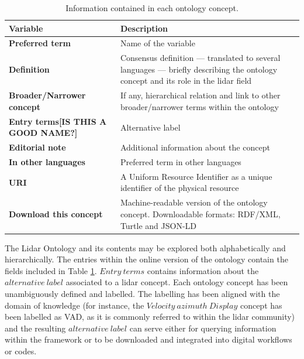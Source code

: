\documentclass[remotesensing,article,submit,pdftex,moreauthors]{Definitions/mdpi}
\begin{document}
\begin{table}[H] 
\caption{Information contained in each ontology concept.
\label{Ontology_var}}
{\def\arraystretch{2}\tabcolsep=11pt
\begin{tabularx}{\textwidth}{lX}
\toprule
\toprule
\textbf{Variable}&\textbf{Description}		\\
\midrule
\midrule
\textbf{Preferred term}	& 	Name of the variable\\
\hline
\textbf{Definition}	& Consensus definition --- translated to several languages --- briefly describing the ontology concept and its role in the lidar field\\
\hline
\textbf{Broader/Narrower concept}	& If any, hierarchical relation and link to other broader/narrower terms within the ontology\\
\hline
\textbf{Entry terms[IS THIS A GOOD NAME?]}	& Alternative label\\
\hline
\textbf{Editorial note}	&  Additional information about the concept \\
\hline
\textbf{In other languages}	& Preferred term in other languages\\
\hline
\textbf{URI}	& A Uniform Resource Identifier as a unique identifier of the physical resource\\
\hline
\textbf{Download this concept} & Machine-readable version of the ontology concept. Downloadable formats: RDF/XML, Turtle and JSON-LD\\
\bottomrule
\bottomrule
\end{tabularx}
}
\end{table}

The Lidar Ontology and its contents may be explored both alphabetically and hierarchically.
The entries within the online version of the ontology contain the fields included in Table \ref{Ontology_var}. $Entry~terms$ contains information about the $alternative~label$ associated to a lidar concept. Each ontology concept has been unambiguously defined and labelled. The labelling has been aligned with the domain of knowledge (for instance, the $Velocity~azimuth~Display$ concept has been labelled as VAD, as it is commonly referred to within the lidar community) and the resulting $alternative~label$ can serve either for querying information within the framework or to be downloaded and integrated into digital workflows or codes. 
\end{document}
